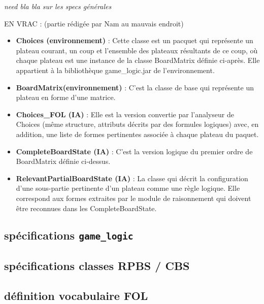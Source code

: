 \emph{need bla bla sur les specs générales}

EN VRAC :
(partie rédigée par Nam au mauvais endroit)

\begin{itemize}
  \item \textbf {\gls{Choices} (environnement)} : Cette classe est un pacquet qui représente un plateau courant, un coup et l'ensemble des plateaux résultants de ce coup, où chaque plateau est une instance de la classe \gls{BoardMatrix} définie ci-après. Elle appartient à la bibliothèque game\_logic.jar de l'environnement.
  \item \textbf {\gls{BoardMatrix}(environnement)} : C'est la classe de base qui représente un plateau en forme d'une matrice. 
  \item \textbf {\gls{Choices_FOL} (IA)} : Elle est la version convertie par l'analyseur de Choices (même structure, attributs décrits par des formules logiques) avec, en addition, une liste de formes pertinentes associée à chaque plateau du paquet.
  \item \textbf {\gls{CompleteBoardState} (IA)} : C'est la version logique du premier ordre de
  \gls{BoardMatrix} définie ci-dessus.
  \item \textbf {\gls{RelevantPartialBoardState} (IA)} : La classe qui décrit la configuration d'une sous-partie pertinente d'un plateau comme une règle logique. Elle correspond aux \og formes \fg{} extraites par le module de raisonnement qui doivent être reconnues dans les \gls{CompleteBoardState}.
\end{itemize}

\subsection{spécifications \texttt{\gls{game_logic}}}
\label{specs_game_logic}
\subsection{spécifications classes RPBS / CBS}
\label{specs_shared_classes}
\subsection{définition vocabulaire FOL}
\label{specs_voc_fol}